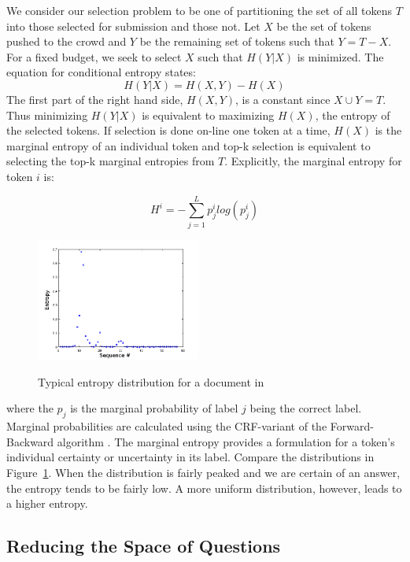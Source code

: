 We consider our selection problem to be one of partitioning the set of all tokens $T$ into those selected for submission and those not.  Let $X$ be the set of tokens pushed to the crowd and $Y$ be the remaining set of tokens such that $Y = T - X$. For a fixed budget, we seek to select $X$ such that $H(Y|X)$ is minimized.  The equation for conditional entropy states:
\begin{equation}
H(Y|X) = H(X,Y) - H(X)
\end{equation}
The first part of the right hand side, $H(X,Y)$, is a constant since $X \cup Y = T$.  Thus minimizing $H(Y|X)$ is equivalent to maximizing $H(X)$, the entropy of the selected tokens.  If selection is done on-line one token at a time, $H(X)$ is the marginal entropy of an individual token and top-k selection is equivalent to selecting the top-k marginal entropies from $T$.  Explicitly, the marginal entropy for token $i$ is:

\begin{equation}
H^{i} = -\sum^{L}_{j=1}p^{i}_{j}log(p^{i}_{j})
\end{equation}

\begin{figure}
		\includegraphics[width=0.48\textwidth]{images/ent_dist1.png}
		\label{fig:ent_dist}
		\caption{Typical entropy distribution for a document in \sysName} 
\end{figure}

where the $p_{j}$ is the marginal probability of label $j$ being the correct label.  Marginal probabilities are calculated using the CRF-variant of the Forward-Backward algorithm \cite{}.  The marginal entropy provides a formulation for a token's individual certainty or uncertainty in its label.  Compare the distributions in Figure~\ref{fig:ent_dist}.  When the distribution is fairly peaked and we are certain of an answer, the entropy tends to be fairly low.  A more uniform distribution, however, leads to a higher entropy.

\subsection{Reducing the Space of Questions}
